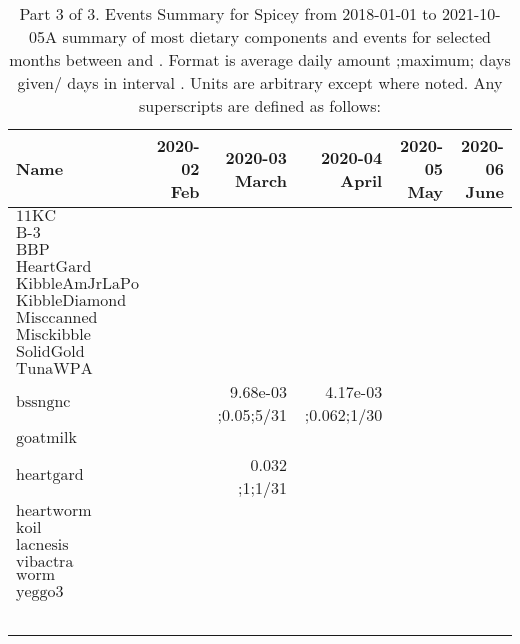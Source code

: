 \begin{table}[H]
\centering
\begin{tabular}{|l|r|r|r|r|r|}
\hline
Name&2020-02 Feb&2020-03 March&2020-04 April&2020-05 May&2020-06 June\\
\hline
$\textrm{11KC}$&&&&&\\
$\textrm{B-3}$&&&&&\\
$\textrm{BBP}$&&&&&\\
$\textrm{HeartGard}$&&&&&\\
$\textrm{KibbleAmJrLaPo}$&&&&&\\
$\textrm{KibbleDiamond}$&&&&&\\
$\textrm{Misccanned}$&&&&&\\
$\textrm{Misckibble}$&&&&&\\
$\textrm{SolidGold}$&&&&&\\
$\textrm{TunaWPA}$&&&&&\\
$\textrm{bssngnc}$&&9.68e-03 ;0.05;5/31&4.17e-03 ;0.062;1/30&&\\
$\textrm{goatmilk}$&&&&&\\
$\textrm{heartgard}$&&0.032 ;1;1/31&&&\\
$\textrm{heartworm}$&&&&&\\
$\textrm{koil}$&&&&&\\
$\textrm{lacnesis}$&&&&&\\
$\textrm{vibactra}$&&&&&\\
$\textrm{worm}$&&&&&\\
$\textrm{yeggo3}$&&&&&\\
&&&&&\\
&&&&&\\
&&&&&\\
&&&&&\\
&&&&&\\
\hline
\end{tabular}
\caption{Part 3 of 3.  Events Summary for Spicey   from 2018-01-01 to 2021-10-05A summary of most dietary components and events  for selected months between \mjmdatemin and \mjmdatemax. Format is average daily amount ;maximum; days given/ days in interval . Units are arbitrary except where noted. Any  superscripts are defined as follows:  \mjmsuperscripts}
\end{table}
